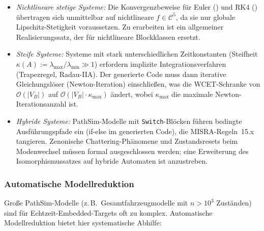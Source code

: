 ﻿\documentclass[12pt,a4paper]{article}
\theoremstyle{definition}
\begin{document}
\begin{itemize}
  \item \emph{Nichtlineare stetige Systeme:} Die Konvergenzbeweise für
        Euler () und RK4 () übertragen
        sich unmittelbar auf nichtlineare $f \in \mathcal{C}^5$, da sie
        nur globale Lipschitz-Stetigkeit voraussetzen. Zu erarbeiten ist
        ein allgemeiner Realisierungssatz, der  für
        nichtlineare Blockklassen ersetzt.

  \item \emph{Steife Systeme:} Systeme mit stark unterschiedlichen
        Zeitkonstanten (Steifheit $\kappa(A) := \lambda_{\max}/\lambda_{\min}
        \gg 1$) erfordern implizite Integrationsverfahren
        (Trapezregel, Radau-IIA). Der generierte Code muss dann
        iterative Gleichungslöser (Newton-Iteration) einschließen,
        was die WCET-Schranke von $\mathcal{O}(|V_B|)$ auf
        $\mathcal{O}(|V_B| \cdot \kappa_{\max})$ ändert, wobei
        $\kappa_{\max}$ die maximale Newton-Iterationsanzahl ist.

  \item \emph{Hybride Systeme:} PathSim-Modelle mit
        \texttt{Switch}-Blöcken führen bedingte Ausführungspfade ein
        (if-else im generierten Code), die MISRA-Regeln~15.x tangieren.
        Zenonische Chattering-Phänomene und Zustandsresets beim
        Modenwechsel müssen formal ausgeschlossen werden; eine
        Erweiterung des Isomorphismussatzes auf hybride Automaten
        ist anzustreben.
\end{itemize}

\subsubsection{Automatische Modellreduktion}

Große PathSim-Modelle (z.\,B.\ Gesamtfahrzeugmodelle mit $n > 10^3$
Zuständen) sind für Echtzeit-Embedded-Targets oft zu komplex. Automatische
Modellreduktion bietet hier systematische Abhilfe:
\end{document}
